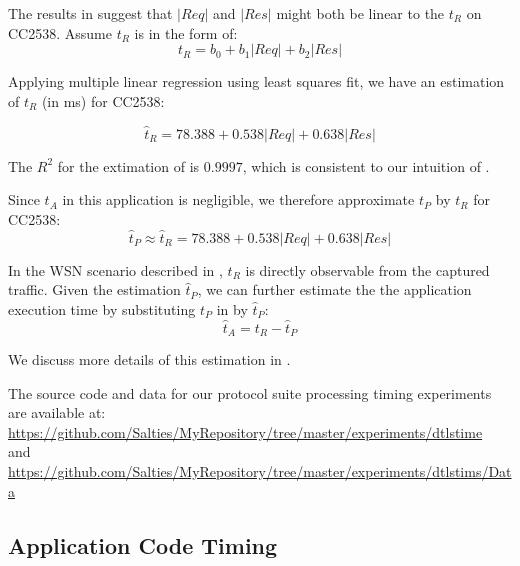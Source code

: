 The results in  suggest that $|Req|$ and $|Res|$ might both be linear to the $t_R$ on CC2538. Assume $t_R$ is in the form of:
\begin{equation} \label{Eq: tR est}
	t_R = b_0 + b_1|Req| + b_2|Res|
\end{equation}

Applying multiple linear regression using least squares fit, we have an estimation of $t_R$ (in ms) for CC2538:

\begin{equation}
	\hat{t}_R = 78.388 + 0.538|Req| + 0.638|Res|
	\label{Eq: t_R estimation}
\end{equation}

The $R^2$ for the extimation of  is $0.9997$, which is consistent to our intuition of .

Since $t_A$ in this application is negligible, we therefore approximate $t_P$ by $t_R$ for CC2538:
\begin{equation} \label{Eq: CC2538tP}
	\hat{t}_P \approx \hat{t}_R = 78.388 + 0.538|Req| + 0.638|Res|
\end{equation}

In the WSN scenario described in , $t_R$ is directly observable from the captured traffic. Given the estimation $\hat{t}_P$, we can further estimate the the application execution time by substituting $t_P$ in  by $\hat{t}_P$:
\begin{equation} \label{Eq: hattA}
	\hat{t}_A = t_R - \hat{t}_P
\end{equation}

We discuss more details of this estimation in .

The source code and data for our protocol suite processing timing experiments are available at: \\
\url{https://github.com/Salties/MyRepository/tree/master/experiments/dtlstime} \\
and \\
\url{https://github.com/Salties/MyRepository/tree/master/experiments/dtlstims/Data}

\subsection{Application Code Timing} \label{App code timing}

